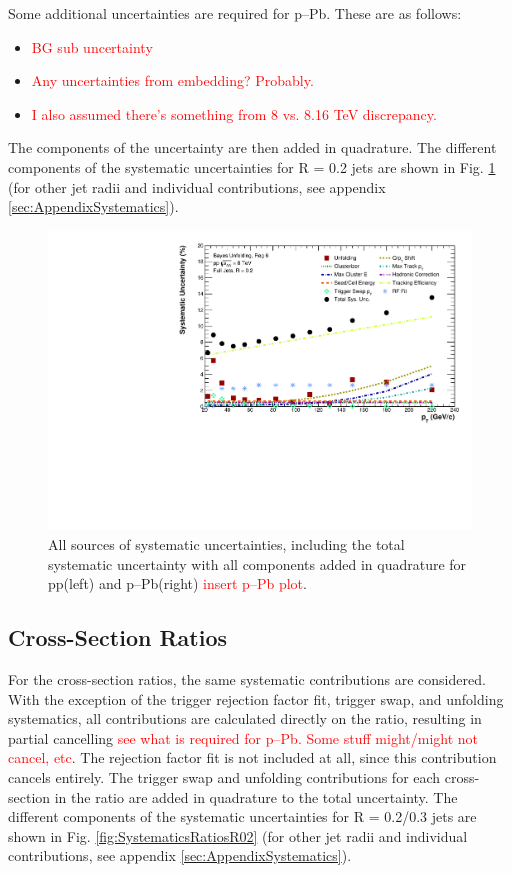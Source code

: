 \documentclass[ALICE]{ALICE_analysis_notes}
\newcommand{\pPb}{{\mbox{p--Pb}}\xspace}
\newcommand{\pp}{pp\xspace}
\begin{document}
Some additional uncertainties are required for \pPb. These are as follows:

\begin{itemize}
    \item \textcolor{red}{BG sub uncertainty}
    \item \textcolor{red}{Any uncertainties from embedding? Probably.}
    \item \textcolor{red}{I also assumed there's something from 8 vs. 8.16 TeV discrepancy.}
\end{itemize}

The components of the uncertainty are then added in quadrature. The different components of the systematic uncertainties for R = 0.2 jets are shown in Fig. \ref{fig:SystematicsSpectraR02} (for other jet radii and individual contributions, see appendix \ref{sec:AppendixSystematics}).

\begin{figure}
    \centering
    \includegraphics[width=15cm]{figures/Systematics/TotalSystematics_R02.pdf}
    \caption{All sources of systematic uncertainties, including the total systematic uncertainty with all components added in quadrature for \pp (left) and \pPb (right) \textcolor{red}{insert \pPb plot}.}
    \label{fig:SystematicsSpectraR02}
\end{figure}

\subsection{Cross-Section Ratios}
\label{sec:SystematicsRatios}

For the cross-section ratios, the same systematic contributions are considered. With the exception of the trigger rejection factor fit, trigger swap, and unfolding systematics, all contributions are calculated directly on the ratio, resulting in partial cancelling \textcolor{red}{see what is required for \pPb. Some stuff might/might not cancel, etc}. The rejection factor fit is not included at all, since this contribution cancels entirely. The trigger swap and unfolding contributions for each cross-section in the ratio are added in quadrature to the total uncertainty. The different components of the systematic uncertainties for R = 0.2/0.3 jets are shown in Fig. \ref{fig:SystematicsRatiosR02} (for other jet radii and individual contributions, see appendix \ref{sec:AppendixSystematics}).
\end{document}
